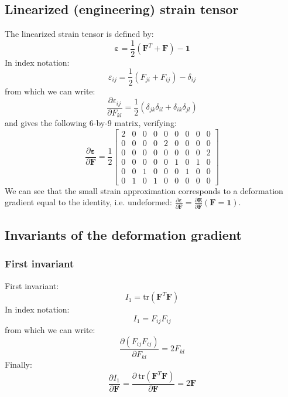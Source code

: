 \documentclass[letterpaper,12pt,oneside]{report}
\begin{document}
\subsection{Linearized (engineering) strain tensor}
The linearized strain tensor is defined by:
\begin{equation}
\boldsymbol{\varepsilon} = \frac{1}{2}\left(\mathbf{F}^T + \mathbf{F}\right) - \mathbf{1}
\end{equation}
In index notation:
\begin{equation}
\varepsilon_{ij} = \frac{1}{2}\left(F_{ji} + F_{ij}\right) - \delta_{ij}
\end{equation}
from which we can write:
\begin{equation}
\frac{\partial \varepsilon_{ij}}{\partial F_{kl}} = \frac{1}{2}\left(\delta_{jk}\delta_{il} + \delta_{ik}\delta_{jl} \right)
\end{equation}
and gives the following 6-by-9 matrix, verifying:
\begin{equation}
\frac{\partial \boldsymbol{\varepsilon}}{\partial \mathbf{F}} = \frac{1}{2}
\left[\begin{array}{ccccccccc}
2 & 0 & 0 & 0 & 0 & 0 & 0 & 0 & 0 \\
0 & 0 & 0 & 0 & 2 & 0 & 0 & 0 & 0 \\
0 & 0 & 0 & 0 & 0 & 0 & 0 & 0 & 2 \\
0 & 0 & 0 & 0 & 0 & 1 & 0 & 1 & 0 \\
0 & 0 & 1 & 0 & 0 & 0 & 1 & 0 & 0 \\
0 & 1 & 0 & 1 & 0 & 0 & 0 & 0 & 0
\end{array}\right]
\end{equation}
We can see that the small strain approximation corresponds to a deformation gradient equal to the identity, i.e. undeformed: $\frac{\partial \boldsymbol{\varepsilon}}{\partial \mathbf{F}} = \frac{\partial \mathbf{E}}{\partial \mathbf{F}}(\mathbf{F}=\mathbf{1})$.

\subsection{Invariants of the deformation gradient}

\subsubsection{First invariant}

First invariant:
\begin{equation}
I_1 = \mathrm{tr}(\bm{F}^T\bm{F})
\end{equation}
In index notation:
\begin{equation}
I_1 = F_{ij} F_{ij}
\end{equation}
from which we can write:
\begin{equation}
\frac{\partial (F_{ij} F_{ij})}{\partial F_{kl}} = 2 F_{kl}
\end{equation}
Finally:
\begin{equation}
\frac{\partial I_1}{\partial \bm{F}} = \frac{ \partial \ \mathrm{tr}(\bm{F}^T\bm{F})}{\partial \bm{F}} = 2 \bm{F}
\end{equation}
\end{document}
